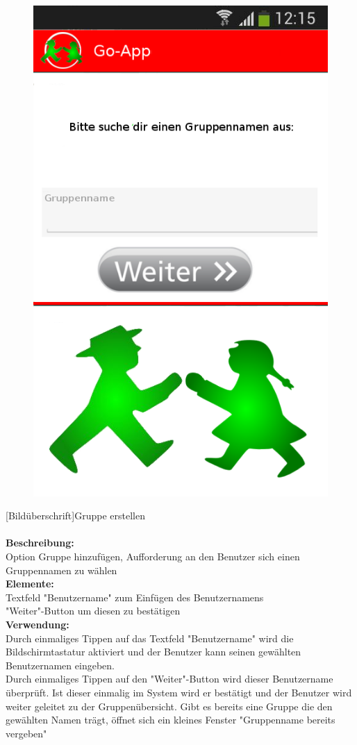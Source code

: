 \begin{figure}
	\includegraphics[scale =1]{resources/images/gruppe_erstellen.png}
\end{figure}
[Bildüberschrift]Gruppe erstellen\\ \\
\textbf{Beschreibung:}\\
Option Gruppe hinzufügen, Aufforderung an den Benutzer sich einen Gruppennamen zu wählen\\
\textbf{Elemente:}\\
Textfeld "Benutzername" zum Einfügen des Benutzernamens\\
"Weiter"-Button um diesen zu bestätigen\\
\textbf{Verwendung:}\\
Durch einmaliges Tippen auf das Textfeld "Benutzername" wird die Bildschirmtastatur aktiviert und der Benutzer kann seinen gewählten Benutzernamen eingeben.\\
Durch einmaliges Tippen auf den "Weiter"-Button wird dieser Benutzername überprüft. Ist dieser einmalig im System wird er bestätigt und der Benutzer wird weiter geleitet zu der Gruppenübersicht. Gibt es bereits eine Gruppe die den gewählten Namen trägt, öffnet sich ein kleines Fenster "Gruppenname bereits vergeben"\\ \\

